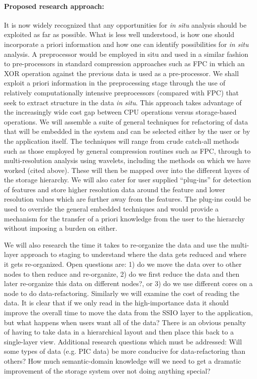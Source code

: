 \paragraph{Proposed research approach:} It is now widely recognized that any
opportunities for {\em in situ} analysis should be exploited as far as
possible. What is less well understood, is how one should incorporate a priori
information and how one can identify possibilities for {\em in situ} analysis.
A preprocessor would be employed in situ and used in a similar fashion to
pre-processors in standard compression approaches such as FPC
\cite{BurtscherFPC} in which an XOR operation against the previous data is used
as a pre-processor.  We shall exploit a priori information in the preprocessing
stage through the use of relatively computationally intensive preprocessors
(compared with FPC) that seek to extract structure in the data {\em in situ}.
This approach takes advantage of the increasingly wide cost gap between CPU
operations versus storage-based operations. 
We will assemble a suite of general techniques for refactoring of data that
will be embedded in the system and can be selected either by the user or by the
application itself. The techniques will range from crude catch-all methods such
as those employed by general compression routines such as FPC, through to
multi-resolution analysis using wavelets, including the methods on which we
have worked (cited above).  These will then be mapped over into the different
layers of the storage hierarchy.  We will also cater for user supplied
``plug-ins'' for detection of features and store higher resolution data around
the feature and lower resolution values which are further away from the
features. The plug-ins could be used to override the general embedded
techniques and would provide a mechanism for the transfer of a priori knowledge
from the user to the hierarchy without imposing a burden on either. 

We will also research the time it takes to re-organize the data and use the
multi-layer approach to staging to understand where the data gets reduced and
where it gets re-organized. Open questions are: 1) do we move the data over to
other nodes to then reduce and re-organize, 2) do we first reduce the data and
then later re-organize this data on different nodes?, or 3) do we use different
cores on a node to do data-refactoring.  Similarly we will examine the cost of
reading the data. It is clear that if we only read in the high-importance data
it should improve the overall time to move the data from the SSIO layer to the
application, but what happens when users want all of the data? There is an
obvious penalty of having to take data in a hierarchical layout and then place
this back to a single-layer view.  Additional research questions which must be
addressed: Will some types of data (e.g. PIC data) be more
conducive  for data-refactoring than others? How much semantic-domain knowledge
will we need to get a dramatic improvement of the storage system over not doing
anything special? 

